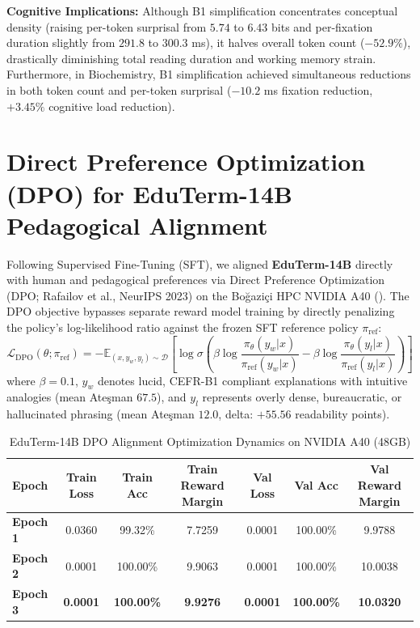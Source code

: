 \documentclass[a4paper,12pt]{report}
\begin{document}
\textbf{Cognitive Implications:} Although B1 simplification concentrates conceptual density (raising per-token surprisal from $5.74$ to $6.43$ bits and per-fixation duration slightly from $291.8$ to $300.3$ ms), it halves overall token count ($-52.9\%$), drastically diminishing total reading duration and working memory strain. Furthermore, in Biochemistry, B1 simplification achieved simultaneous reductions in both token count and per-token surprisal ($-10.2$ ms fixation reduction, $+3.45\%$ cognitive load reduction).

\section{Direct Preference Optimization (DPO) for EduTerm-14B Pedagogical Alignment}
\label{sec:dpo_14b_alignment}
Following Supervised Fine-Tuning (SFT), we aligned \textbf{EduTerm-14B} directly with human and pedagogical preferences via Direct Preference Optimization (DPO; Rafailov et al., NeurIPS 2023) on the Boğaziçi HPC NVIDIA A40 (). 
The DPO objective bypasses separate reward model training by directly penalizing the policy's log-likelihood ratio against the frozen SFT reference policy $\pi_{\text{ref}}$:
\begin{equation}
\mathcal{L}_{\text{DPO}}(\theta; \pi_{\text{ref}}) = -\mathbb{E}_{(x, y_w, y_l) \sim \mathcal{D}} \left[ \log \sigma \left( \beta \log \frac{\pi_\theta(y_w|x)}{\pi_{\text{ref}}(y_w|x)} - \beta \log \frac{\pi_\theta(y_l|x)}{\pi_{\text{ref}}(y_l|x)} \right) \right]
\end{equation}
where $\beta = 0.1$, $y_w$ denotes lucid, CEFR-B1 compliant explanations with intuitive analogies (mean Ateşman $67.5$), and $y_l$ represents overly dense, bureaucratic, or hallucinated phrasing (mean Ateşman $12.0$, delta: $+55.56$ readability points).

\begin{table}[htbp]
\centering
\small
\caption{EduTerm-14B DPO Alignment Optimization Dynamics on NVIDIA A40 (48GB)}
\label{tab:dpo_14b_dynamics}
\scriptsize\setlength{\tabcolsep}{2pt}
\begin{tabularx}{\textwidth}{>{\RaggedRight\arraybackslash}Xcccccc}
\hline
\textbf{Epoch} & \textbf{Train Loss} & \textbf{Train Acc} & \textbf{Train Reward Margin} & \textbf{Val Loss} & \textbf{Val Acc} & \textbf{Val Reward Margin} \\
\hline
\textbf{Epoch 1} & 0.0360 & 99.32\% & 7.7259 & 0.0001 & 100.00\% & 9.9788 \\
\textbf{Epoch 2} & 0.0001 & 100.00\% & 9.9063 & 0.0001 & 100.00\% & 10.0038 \\
\textbf{Epoch 3} & \textbf{0.0001} & \textbf{100.00\%} & \textbf{9.9276} & \textbf{0.0001} & \textbf{100.00\%} & \textbf{10.0320} \\
\hline
\end{tabularx}
\end{table}
\end{document}
